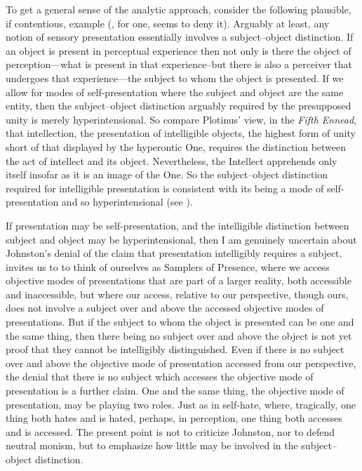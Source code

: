 To get a general sense of the analytic approach, consider the following plausible, if contentious, example (\citealt{Johnston:2007qy}, for one, seems to deny it). Arguably at least, any notion of sensory presentation essentially involves a subject--object distinction. If an object is present in perceptual experience then not only is there the object of perception---what is present in that experience--but there is also a perceiver that undergoes that experience---the subject to whom the object is presented. If we allow for modes of self-presentation where the subject and object are the same entity, then the subject--object distinction arguably required by the presupposed unity is merely hyperintensional. So compare Plotinus' view, in the \emph{Fifth Ennead}, that intellection, the presentation of intelligible objects, the highest form of unity short of that displayed by the hyperontic One, requires the distinction between the act of intellect and its object. Nevertheless, the Intellect apprehends only itself insofar as it is an image of the One. So the subject--object distinction required for intelligible presentation is consistent with its being a mode of self-presentation and so hyperintensional (see \citealt[chapter 3.1]{Gerson:1994aa}). 

If presentation may be self-presentation, and the intelligible distinction between subject and object may be hyperintensional, then I am genuinely uncertain about Johnston's denial of the claim that presentation intelligibly requires a subject. \citet{Johnston:2007qy} invites us to to think of ourselves as Samplers of Presence, where we access objective modes of presentations that are part of a larger reality, both accessible and inaccessible, but where our access, relative to our perspective, though ours, does not involve a subject over and above the accessed objective modes of presentations. But if the subject to whom the object is presented can be one and the same thing, then there being no subject over and above the object is not yet proof that they cannot be intelligibly distinguished. Even if there is no subject over and above the objective mode of presentation accessed from our perspective, the denial that there is no subject which accesses the objective mode of presentation is a further claim. One and the same thing, the objective mode of presentation, may be playing two roles. Just as in self-hate, where, tragically, one thing both hates and is hated, perhaps, in perception, one thing both accesses and is accessed. The present point is not to criticize Johnston, nor to defend neutral monism, but to emphasize how little may be involved in the subject--object distinction.

